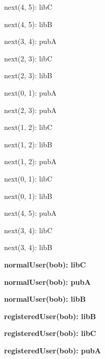 \documentclass{article}
\newenvironment{states}
        {\begin{minipage}{\tableWidth}\raggedright\begin{description}[align=left,leftmargin=1em,noitemsep,labelsep=\parindent]}
        {\end{description}\end{minipage}}
\begin{document}
{\begin{states}
\item{{next(\allowbreak{}4, 5): libC}}
\item{{next(\allowbreak{}4, 5): libB}}
\item{{next(\allowbreak{}3, 4): pubA}}
\item{{next(\allowbreak{}2, 3): libC}}
\item{{next(\allowbreak{}2, 3): libB}}
\item{{next(\allowbreak{}0, 1): pubA}}
\item{{next(\allowbreak{}2, 3): pubA}}
\item{{next(\allowbreak{}1, 2): libC}}
\item{{next(\allowbreak{}1, 2): libB}}
\item{{next(\allowbreak{}1, 2): pubA}}
\item{{next(\allowbreak{}0, 1): libC}}
\item{{next(\allowbreak{}0, 1): libB}}
\item{{next(\allowbreak{}4, 5): pubA}}
\item{{next(\allowbreak{}3, 4): libC}}
\item{{next(\allowbreak{}3, 4): libB}}
\item\textbf{{normalUser(\allowbreak{}bob): libC}}
\item\textbf{{normalUser(\allowbreak{}bob): pubA}}
\item\textbf{{normalUser(\allowbreak{}bob): libB}}
\item\textbf{{registeredUser(\allowbreak{}bob): libB}}
\item\textbf{{registeredUser(\allowbreak{}bob): libC}}
\item\textbf{{registeredUser(\allowbreak{}bob): pubA}}
\end{states}}
\end{document}
